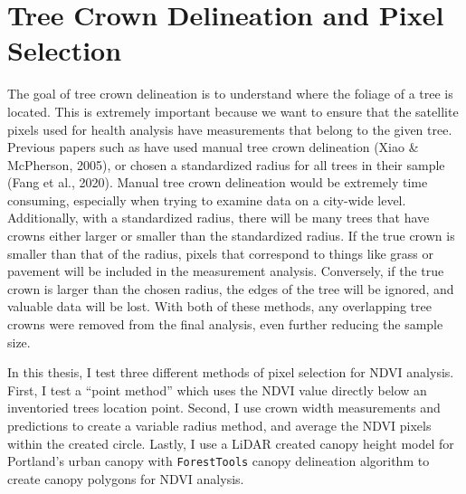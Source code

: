 \documentclass[12pt,twoside]{reedthesis}
\begin{document}
\hypertarget{tree-crown-delineation-and-pixel-selection}{%
\section{Tree Crown Delineation and Pixel Selection}\label{tree-crown-delineation-and-pixel-selection}}

The goal of tree crown delineation is to understand where the foliage of
a tree is located. This is extremely important because we want to ensure
that the satellite pixels used for health analysis have measurements
that belong to the given tree. Previous papers such as have used manual
tree crown delineation (Xiao \& McPherson, 2005), or chosen a standardized radius for
all trees in their sample (Fang et al., 2020). Manual tree crown delineation
would be extremely time consuming, especially when trying to examine
data on a city-wide level. Additionally, with a standardized radius,
there will be many trees that have crowns either larger or smaller than
the standardized radius. If the true crown is smaller than that of the
radius, pixels that correspond to things like grass or pavement will be
included in the measurement analysis. Conversely, if the true crown is
larger than the chosen radius, the edges of the tree will be ignored,
and valuable data will be lost. With both of these methods, any
overlapping tree crowns were removed from the final analysis, even
further reducing the sample size.

In this thesis, I test three different methods of pixel selection for
NDVI analysis. First, I test a ``point method'' which uses the NDVI value
directly below an inventoried trees location point. Second, I use crown
width measurements and predictions to create a variable radius method,
and average the NDVI pixels within the created circle. Lastly, I use a
LiDAR created canopy height model for Portland's urban canopy with
\texttt{ForestTools} canopy delineation algorithm to create canopy polygons for
NDVI analysis.
\end{document}
